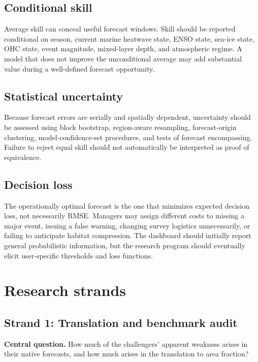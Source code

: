 \documentclass[11pt]{article}
\newcommand{\MHW}{marine heatwave}
\begin{document}
\subsection{Conditional skill}

Average skill can conceal useful forecast windows. Skill should be reported conditional on season, current \MHW{} state, ENSO state, sea-ice state, OHC state, event magnitude, mixed-layer depth, and atmospheric regime. A model that does not improve the unconditional average may add substantial value during a well-defined forecast opportunity.

\subsection{Statistical uncertainty}

Because forecast errors are serially and spatially dependent, uncertainty should be assessed using block bootstrap, region-aware resampling, forecast-origin clustering, model-confidence-set procedures, and tests of forecast encompassing. Failure to reject equal skill should not automatically be interpreted as proof of equivalence.

\subsection{Decision loss}

The operationally optimal forecast is the one that minimizes expected decision loss, not necessarily RMSE. Managers may assign different costs to missing a major event, issuing a false warning, changing survey logistics unnecessarily, or failing to anticipate habitat compression. The dashboard should initially report general probabilistic information, but the research program should eventually elicit user-specific thresholds and loss functions.

\section{Research strands}

\subsection{Strand 1: Translation and benchmark audit}

\textbf{Central question.} How much of the challengers' apparent weakness arises in their native forecasts, and how much arises in the translation to area fraction?
\end{document}
